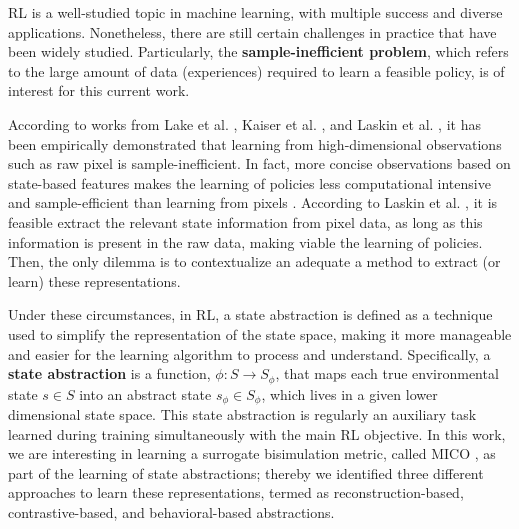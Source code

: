 
RL is a well-studied topic in machine learning, with multiple success and diverse applications. Nonetheless, there are still certain challenges in practice that have been widely studied. Particularly, the \textbf{sample-inefficient problem}, which refers to the large amount of data (experiences) required to learn a feasible policy, is of interest for this current work.

According to works from Lake et al. \cite{lake2017building}, Kaiser et al. \cite{kaiser2019model}, and Laskin et al. \cite{laskin2020curl}, it has been empirically demonstrated that learning from high-dimensional observations such as raw pixel is sample-inefficient. In fact, more concise observations based on state-based features makes the learning of policies less computational intensive and sample-efficient than learning from pixels \cite{tassa2018deepmind}. According to Laskin et al. \cite{laskin2020curl}, it is feasible extract the relevant state information from pixel data, as long as this information is present in the raw data, making viable the learning of policies. Then, the only dilemma is to contextualize an adequate a method to extract (or learn) these representations. 


Under these circumstances, in RL, a state abstraction is defined as a technique used to simplify the representation of the state space, making it more manageable and easier for the learning algorithm to process and understand. Specifically, a \textbf{state abstraction} \cite{abel2022theory} is a function, $\phi : S \rightarrow S_\phi$, that maps each true environmental state $s \in S$ into an abstract state $s_\phi \in S_\phi$, which lives in a given lower dimensional state space. This state abstraction is regularly an auxiliary task learned during training simultaneously with the main RL objective. In this work, we are interesting in learning a surrogate bisimulation metric, called MICO \cite{castro2021mico}, as part of the learning of state abstractions; thereby we identified three different approaches to learn these representations, termed as reconstruction-based, contrastive-based, and behavioral-based abstractions.

